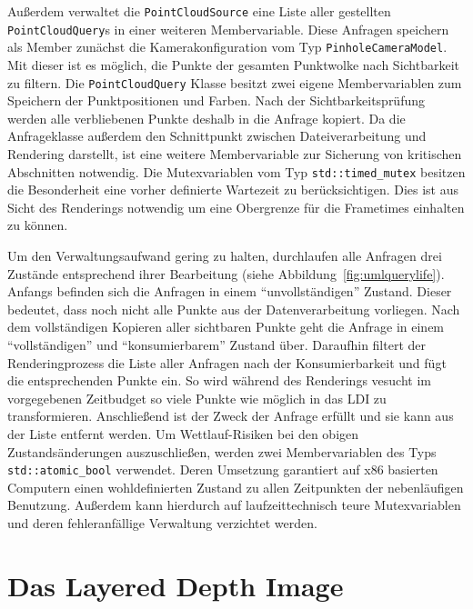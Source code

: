\documentclass[hyperref, beleg, german]{cgvpub}
\begin{document}
Außerdem verwaltet die \texttt{PointCloudSource} eine Liste aller gestellten
\texttt{PointCloudQuery}s in einer weiteren Membervariable. Diese Anfragen
speichern als Member zunächst die Kamerakonfiguration vom Typ
\texttt{PinholeCameraModel}. Mit dieser ist es möglich, die Punkte der gesamten
Punktwolke nach Sichtbarkeit zu filtern. Die \texttt{PointCloudQuery} Klasse
besitzt zwei eigene Membervariablen zum Speichern der Punktpositionen und
Farben. Nach der Sichtbarkeitsprüfung werden alle verbliebenen Punkte deshalb
in die Anfrage kopiert. Da die Anfrageklasse außerdem den Schnittpunkt zwischen
Dateiverarbeitung und Rendering darstellt, ist eine weitere Membervariable zur
Sicherung von kritischen Abschnitten notwendig. Die Mutexvariablen vom Typ
\texttt{std::timed\_mutex} besitzen die Besonderheit eine vorher definierte
Wartezeit zu berücksichtigen. Dies ist aus Sicht des Renderings notwendig um
eine Obergrenze für die Frametimes einhalten zu können.

Um den Verwaltungsaufwand gering zu halten, durchlaufen alle Anfragen drei
Zustände entsprechend ihrer Bearbeitung (siehe
Abbildung~\ref{fig:umlquerylife}). Anfangs befinden sich die Anfragen in einem
``unvollständigen'' Zustand. Dieser bedeutet, dass noch nicht alle Punkte aus
der Datenverarbeitung vorliegen. Nach dem vollständigen Kopieren aller
sichtbaren Punkte geht die Anfrage in einem ``vollständigen'' und
``konsumierbarem'' Zustand über. Daraufhin filtert der Renderingprozess die
Liste aller Anfragen nach der Konsumierbarkeit und fügt die entsprechenden
Punkte ein. So wird während des Renderings vesucht im vorgegebenen Zeitbudget
so viele Punkte wie möglich in das LDI zu transformieren. Anschließend ist der
Zweck der Anfrage erfüllt und sie kann aus der Liste entfernt werden. Um
Wettlauf-Risiken bei den obigen Zustandsänderungen auszuschließen, werden zwei
Membervariablen des Typs \texttt{std::atomic\_bool} verwendet. Deren Umsetzung
garantiert auf x86 basierten Computern einen wohldefinierten Zustand zu allen
Zeitpunkten der nebenläufigen Benutzung. Außerdem kann hierdurch auf
laufzeittechnisch teure Mutexvariablen und deren fehleranfällige Verwaltung
verzichtet werden.

\section{Das Layered Depth Image}
\end{document}
